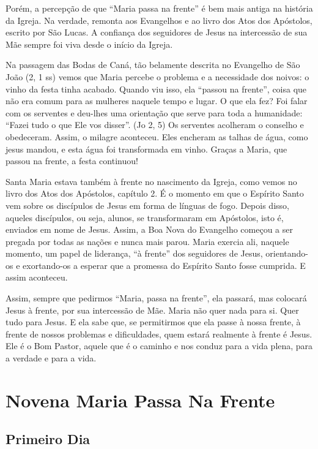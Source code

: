 \documentclass[a4paper,14pt]{extarticle} \usepackage[utf8]{inputenc}
\begin{document}
Porém, a percepção de que “Maria passa na frente” é bem mais antiga na história da Igreja. Na verdade, remonta aos Evangelhos e ao livro dos Atos dos Apóstolos, escrito por São Lucas. A confiança dos seguidores de Jesus na intercessão de sua Mãe sempre foi viva desde o início da Igreja.

Na passagem das Bodas de Caná, tão belamente descrita no Evangelho de São João (2, 1 ss) vemos que Maria percebe o problema e a necessidade dos noivos: o vinho da festa tinha acabado. Quando viu isso, ela “passou na frente”, coisa que não era comum para as mulheres naquele tempo e lugar. O que ela fez? Foi falar com os serventes e deu-lhes uma orientação que serve para toda a humanidade: “Fazei tudo o que Ele vos disser”. (Jo 2, 5) Os serventes acolheram o conselho e obedeceram. Assim, o milagre aconteceu. Eles encheram as talhas de água, como jesus mandou, e esta água foi transformada em vinho. Graças a Maria, que passou na frente, a festa continuou!

Santa Maria estava também à frente no nascimento da Igreja, como vemos no livro dos Atos dos Apóstolos, capítulo 2. É o momento em que o Espírito Santo vem sobre os discípulos de Jesus em forma de línguas de fogo. Depois disso, aqueles discípulos, ou seja, alunos, se transformaram em Apóstolos, isto é, enviados em nome de Jesus. Assim, a Boa Nova do Evangelho começou a ser pregada por todas as nações e nunca mais parou. Maria exercia ali, naquele momento, um papel de liderança, “à frente” dos seguidores de Jesus, orientando-os e exortando-os a esperar que a promessa do Espírito Santo fosse cumprida. E assim aconteceu.

Assim, sempre que pedirmos “Maria, passa na frente”, ela passará, mas colocará Jesus à frente, por sua intercessão de Mãe. Maria não quer nada para si. Quer tudo para Jesus. E ela sabe que, se permitirmos que ela passe à nossa frente, à frente de nossos problemas e dificuldades, quem estará realmente à frente é Jesus. Ele é o Bom Pastor, aquele que é o caminho e nos conduz para a vida plena, para a verdade e para a vida.

\newpage

\section{Novena Maria Passa Na Frente}

\subsection{Primeiro Dia}
\end{document}
